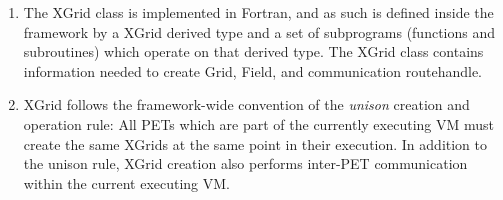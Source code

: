 

\begin{enumerate}

\item The XGrid class is implemented in Fortran, and as such is
defined inside the framework by a XGrid derived type and a set of 
subprograms (functions and subroutines) which operate on that derived type.  
The XGrid class contains information needed to create Grid, Field, and
communication routehandle.

\item XGrid follows the framework-wide convention of the
{\it unison} creation and operation rule: All PETs which are
part of the currently executing VM must create the
same XGrids at the same point in their execution. 
In addition to the unison rule, XGrid creation also performs inter-PET
communication within the current executing VM. 
\end{enumerate}
